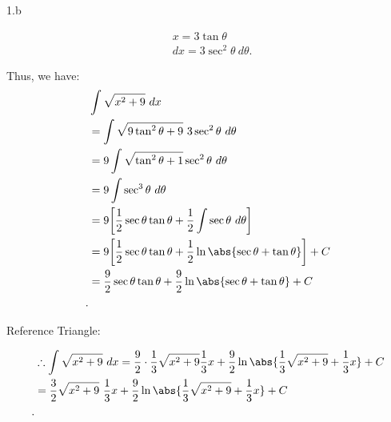 \documentclass{report}
\begin{document}
    \pagebreak \bigbreak \noindent 
    1.b
    \bigbreak \noindent 
    \begin{minipage}[t]{0.47\textwidth}
        \begin{align*}
            &x = 3\tan{\theta } \\
            &dx = 3\sec^{2}{\theta}\ d\theta 
        .\end{align*} 
    \end{minipage}
    \begin{minipage}[t]{0.47\textwidth}
        Thus, we have:
    \begin{align*}
        &\int \sqrt{x^{2} + 9}\ dx  \\
        &= \int \sqrt{9\tan^{2}{\theta } + 9}\ 3\sec^{2}{\theta }\ d\theta  \\
        &=9 \int \sqrt{\tan^{2}{\theta }+1}\sec^{2}{\theta }\ d\theta  \\
        &=9\int \sec^{3}{\theta }\ d\theta  \\
        &= 9\bigg[\frac{1}{2}\sec{\theta }\tan{\theta } + \frac{1}{2}\int \sec{\theta }\ d\theta \bigg] \\
        &= 9\bigg[\frac{1}{2}\sec{\theta }\tan{\theta }+\frac{1}{2}\ln{\abs{\sec{\theta }  +\tan{\theta }}}\bigg] + C \\
        &= \frac{9}{2}\sec{\theta }\tan{\theta } + \frac{9}{2} \ln{\abs{\sec{\theta } + \tan{\theta }}}  + C \\
    .\end{align*}
    \end{minipage}
    \bigbreak \noindent 
    \begin{minipage}[]{0.47\textwidth}
        Reference Triangle:
        \bigbreak \noindent 
    \end{minipage}
    \begin{minipage}[]{0.47\textwidth}
        \begin{align*}
            &\therefore \int \sqrt{x^{2} + 9}\ dx = \frac{9}{2} \cdot \frac{1}{3}\sqrt{x^{2}+9}\frac{1}{3}x +\frac{9}{2}\ln{\abs{\frac{1}{3}\sqrt{x^{2}+9} + \frac{1}{3}x}} + C \\
            &=\frac{3}{2}\sqrt{x^{2}+9}\ \frac{1}{3}x +\frac{9}{2}\ln{\abs{\frac{1}{3}\sqrt{x^{2}+9} + \frac{1}{3}x}} + C \\
        .\end{align*}
    \end{minipage}
\end{document}
